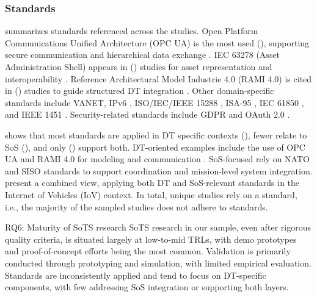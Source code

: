 \subsubsection{Standards}\label{sec:standards}





 summarizes standards referenced across the studies. Open Platform Communications Unified Architecture (OPC UA) is the most used (), supporting secure communication and hierarchical data exchange \cite{dobie2024network, joseph2021aggregated}. IEC 63278 (Asset Administration Shell) appears in () studies for asset representation and interoperability \cite{gill2022method, gollner2022collaborative}. Reference Architectural Model Industrie 4.0 (RAMI 4.0) is cited in () studies to guide structured DT integration \cite{binder2021utilizing}. Other domain-specific standards include VANET, IPv6 \cite{alam2017c2ps}, ISO/IEC/IEEE 15288 \cite{altamiranda2019system}, ISA-95 \cite{dobie2024network}, IEC 61850 \cite{jiang2022novel}, and IEEE 1451 \cite{li2022cognitive}. Security-related standards include GDPR \cite{stary2022privacy} and OAuth 2.0 \cite{human2023design, jiang2022novel}.




 shows that most standards are applied in DT specific contexts (), fewer relate to SoS (), and only () support both. DT-oriented examples include the use of OPC UA and RAMI 4.0 for modeling and communication \cite{binder2021utilizing}. SoS-focused rely on NATO and SISO standards to support coordination and mission-level system integration\cite{barden2022academic}. \textcite{vermesan2021internet} present a combined view, applying both DT and SoS-relevant standards in the Internet of Vehicles (IoV) context.
In total,  unique studies rely on a standard, i.e., the majority of the sampled studies does not adhere to standards.



\begin{conclusionframe}{RQ6: Maturity of SoTS research}
SoTS research in our sample, even after rigorous quality criteria, is situated largely at low-to-mid TRLs, with demo prototypes and proof-of-concept efforts being the most common.
Validation is primarily conducted through prototyping and simulation, with limited empirical evaluation. Standards are inconsistently applied and tend to focus on DT-specific components, with few addressing SoS integration or supporting both layers.
\end{conclusionframe}


